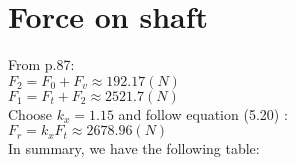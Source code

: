 \section{Force on shaft}
From p.87:\\
$ F_2 = F_0 + F_v \approx 192.17 \unit{(N)}$\\
$ F_1 = F_t + F_2 \approx 2521.7 \unit{(N)}$\\
Choose $ k_x=1.15 $ and follow equation (5.20) :\\
$ F_r = k_xF_t \approx 2678.96\unit{(N)} $\\
In summary, we have the following table:


